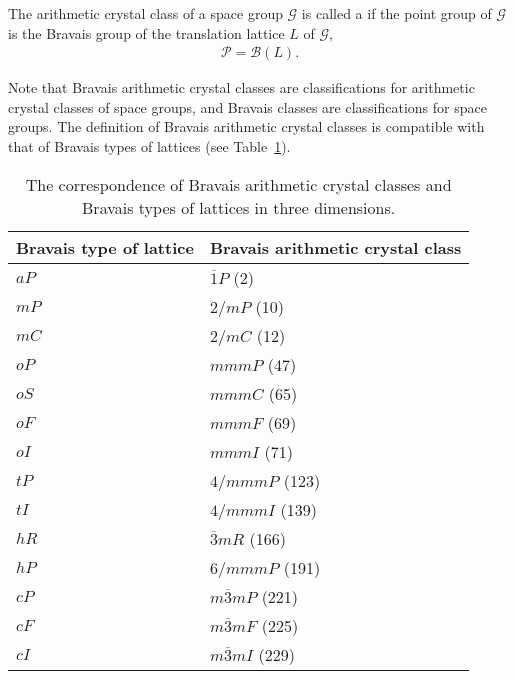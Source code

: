 \begin{screen}
  \begin{defn}
    The arithmetic crystal class of a space group $\mathcal{G}$ is called a  if the point group of $\mathcal{G}$ is the Bravais group of the translation lattice $L$ of $\mathcal{G}$,
    \begin{align}
      \mathcal{P} = \mathcal{B}(L).
    \end{align}
  \end{defn}
\end{screen}

Note that Bravais arithmetic crystal classes are classifications for arithmetic crystal classes of space groups, and Bravais classes are classifications for space groups.
The definition of Bravais arithmetic crystal classes is compatible with that of Bravais types of lattices (see Table~\ref{table:arithmetic-class-3d}).

\begin{table}[htb]
  \centering
  \caption{The correspondence of Bravais arithmetic crystal classes and Bravais types of lattices in three dimensions.}
  \label{table:arithmetic-class-3d}
  \begin{tabular}{l|l}
    \hline
    Bravais type of lattice & Bravais arithmetic crystal class \\ \hline
    $aP$                    & $\overline{1}P$ (2)              \\ \hline
    $mP$                    & $2/mP$ (10)                      \\
    $mC$                    & $2/mC$ (12)                      \\ \hline
    $oP$                    & $mmmP$ (47)                      \\
    $oS$                    & $mmmC$ (65)                      \\
    $oF$                    & $mmmF$ (69)                      \\
    $oI$                    & $mmmI$ (71)                   \\ \hline
    $tP$                    & $4/mmmP$ (123)                   \\
    $tI$                    & $4/mmmI$ (139)                   \\ \hline
    $hR$                    & $\overline{3}mR$ (166)           \\
    $hP$                    & $6/mmmP$ (191)                   \\ \hline
    $cP$                    & $m\overline{3}mP$ (221)          \\
    $cF$                    & $m\overline{3}mF$ (225)          \\
    $cI$                    & $m\overline{3}mI$ (229)          \\ \hline
  \end{tabular}
\end{table}

